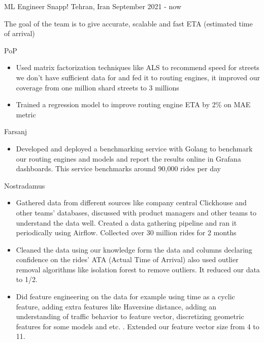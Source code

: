 \begin{cventries}
  \cventry
    {ML Engineer} %
    {Snapp!} %
    {Tehran, Iran} %
    {September 2021 - now} %
    {
      \begin{cvitems} %
        \item The goal of the team is to give accurate, scalable and fast ETA (estimated time of arrival)
        \item PoP
        \begin{itemize}
          \item Used matrix factorization techniques like ALS to recommend speed for streets we don't have sufficient data for and fed it to routing engines, it improved our coverage from one million shard streets to 3 millions
          \item Trained a regression model to improve routing engine ETA by 2\% on MAE metric
        \end{itemize}
        \item Farsanj
        \begin{itemize}
          \item Developed and deployed a benchmarking service with Golang to benchmark our routing engines and models and report the results online in Grafana dashboards. This service benchmarks around 90,000 rides per day
        \end{itemize}
        \item Nostradamus
        \begin{itemize}
          \item Gathered data from different sources like company central Clickhouse and other teams' databases, discussed with product managers and other teams to understand the data well. Created a data gathering pipeline and ran it periodically using Airflow. Collected over 30 million rides for 2 months
          \item Cleaned the data using our knowledge form the data and columns declaring confidence on the rides' ATA (Actual Time of Arrival) also used outlier removal algorithms like isolation forest to remove outliers. It reduced our data to 1/2.
          \item Did feature engineering on the data for example using time as a cyclic feature, adding extra features like Haversine distance, adding an understanding of traffic behavior to feature vector, discretizing geometric features for some models and etc. . Extended our feature vector size from 4 to 11.

\end{itemize}
\end{cvitems}}
\end{cventries}
